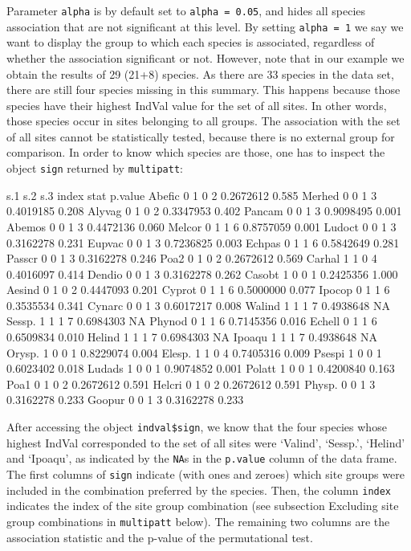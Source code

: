 \documentclass[11pt,a4paper]{article}
\begin{document}
Parameter \texttt{alpha} is by default set to \texttt{alpha = 0.05}, and hides all species association that are not significant at this level. By setting \texttt{alpha = 1} we say we want to display the group to which each species is associated, regardless of whether the association significant or not. However, note that in our example we obtain the results of 29 (21+8) species. As there are 33 species in the data set, there are still four species missing in this summary. This happens because those species have their highest IndVal value for the set of all sites. In other words, those species occur in sites belonging to all groups. The association with the set of all sites cannot be statistically tested, because there is no external group for comparison. In order to know which species are those, one has to inspect the object \texttt{sign} returned by \texttt{multipatt}:
\begin{Schunk}
\begin{Soutput}
       s.1 s.2 s.3 index      stat p.value
Abefic   0   1   0     2 0.2672612   0.585
Merhed   0   0   1     3 0.4019185   0.208
Alyvag   0   1   0     2 0.3347953   0.402
Pancam   0   0   1     3 0.9098495   0.001
Abemos   0   0   1     3 0.4472136   0.060
Melcor   0   1   1     6 0.8757059   0.001
Ludoct   0   0   1     3 0.3162278   0.231
Eupvac   0   0   1     3 0.7236825   0.003
Echpas   0   1   1     6 0.5842649   0.281
Passcr   0   0   1     3 0.3162278   0.246
Poa2     0   1   0     2 0.2672612   0.569
Carhal   1   1   0     4 0.4016097   0.414
Dendio   0   0   1     3 0.3162278   0.262
Casobt   1   0   0     1 0.2425356   1.000
Aesind   0   1   0     2 0.4447093   0.201
Cyprot   0   1   1     6 0.5000000   0.077
Ipocop   0   1   1     6 0.3535534   0.341
Cynarc   0   0   1     3 0.6017217   0.008
Walind   1   1   1     7 0.4938648      NA
Sessp.   1   1   1     7 0.6984303      NA
Phynod   0   1   1     6 0.7145356   0.016
Echell   0   1   1     6 0.6509834   0.010
Helind   1   1   1     7 0.6984303      NA
Ipoaqu   1   1   1     7 0.4938648      NA
Orysp.   1   0   0     1 0.8229074   0.004
Elesp.   1   1   0     4 0.7405316   0.009
Psespi   1   0   0     1 0.6023402   0.018
Ludads   1   0   0     1 0.9074852   0.001
Polatt   1   0   0     1 0.4200840   0.163
Poa1     0   1   0     2 0.2672612   0.591
Helcri   0   1   0     2 0.2672612   0.591
Physp.   0   0   1     3 0.3162278   0.233
Goopur   0   0   1     3 0.3162278   0.233
\end{Soutput}
\end{Schunk}
After accessing the object \texttt{indval\$sign}, we know that the four species whose highest IndVal corresponded to the set of all sites were `Valind', `Sessp.', `Helind' and `Ipoaqu', as indicated by the \texttt{NA}s in the \texttt{p.value} column of the data frame. The first columns of \texttt{sign} indicate (with ones and zeroes) which site groups were included in the combination preferred by the species. Then, the column \texttt{index} indicates the index of the site group combination (see subsection Excluding site group combinations in \texttt{multipatt} below). The remaining two columns are the association statistic and the p-value of the permutational test.
\end{document}
